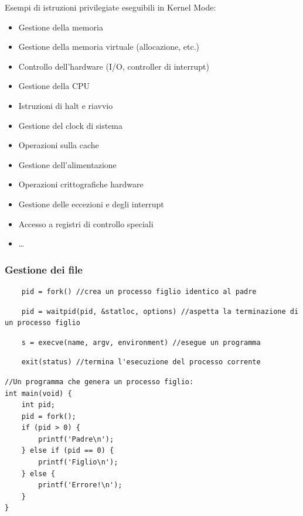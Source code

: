 Esempi di istruzioni privilegiate eseguibili in Kernel Mode:
\small\begin{itemize}
    \item Gestione della memoria
    \item Gestione della memoria virtuale (allocazione, etc.)
    \item Controllo dell'hardware (I/O, controller di interrupt)
    \item Gestione della CPU
    \item Istruzioni di halt e riavvio
    \item Gestione del clock di sistema
    \item Operazioni sulla cache
    \item Gestione dell'alimentazione
    \item Operazioni crittografiche hardware
    \item Gestione delle eccezioni e degli interrupt
    \item Accesso a registri di controllo speciali
    \item \dots
\end{itemize}





\subsubsection{Gestione dei file}

\begin{lstlisting} 
    pid = fork() //crea un processo figlio identico al padre
\end{lstlisting}

\begin{lstlisting} 
    pid = waitpid(pid, &statloc, options) //aspetta la terminazione di un processo figlio
\end{lstlisting}

\begin{lstlisting} 
    s = execve(name, argv, environment) //esegue un programma
\end{lstlisting}

\begin{lstlisting} 
    exit(status) //termina l'esecuzione del processo corrente
\end{lstlisting}

\begin{lstlisting} 
//Un programma che genera un processo figlio:
int main(void) {
    int pid;
    pid = fork();
    if (pid > 0) {
        printf('Padre\n');
    } else if (pid == 0) {
        printf('Figlio\n');
    } else {
        printf('Errore!\n');
    }
}
\end{lstlisting}

